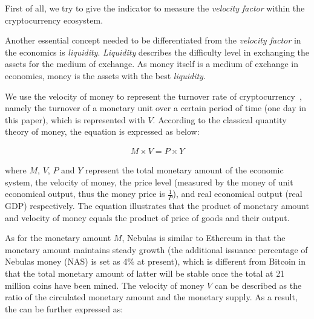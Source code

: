 First of all, we try to give the indicator to measure the \emph{velocity factor} within the cryptocurrency ecosystem.

Another essential concept needed to be differentiated from the \emph{velocity factor} in the economics is \emph{liquidity}. \emph{Liquidity} describes the difficulty level in exchanging the assets for the medium of exchange. As money itself is a medium of exchange in economics, money is the assets with the best \emph{liquidity}.


We use the velocity of money to represent the turnover rate of cryptocurrency~\cite{selden}, namely the turnover of a monetary unit over a certain period of time (one day in this paper), which is represented with $V$. According to the classical quantity theory of money, the equation is expressed as below:

\begin{align}
M\times V=P\times Y
\label{eq:currency}
\end{align}

\noindent where $M$, $V$, $P$ and $Y$ represent the total monetary amount of the economic system, the velocity of money, the price level (measured by the money of unit economical output, thus the money price is $\frac{1}{P}$), and real economical output (real GDP) respectively. The equation illustrates that the product of monetary amount and velocity of money equals the product of price of goods and their output.

As for the monetary amount $M$, Nebulas is similar to Ethereum in that the
monetary amount maintains steady growth (the additional issuance percentage of
Nebulas money (NAS) is set as 4\% at present), which is different from Bitcoin
in that the total monetary amount of latter will be stable once the total at 21
million coins have been mined. The velocity of money $V$ can be described as
the ratio of the circulated monetary amount and the monetary supply. As a
result, the  can be further expressed as:

